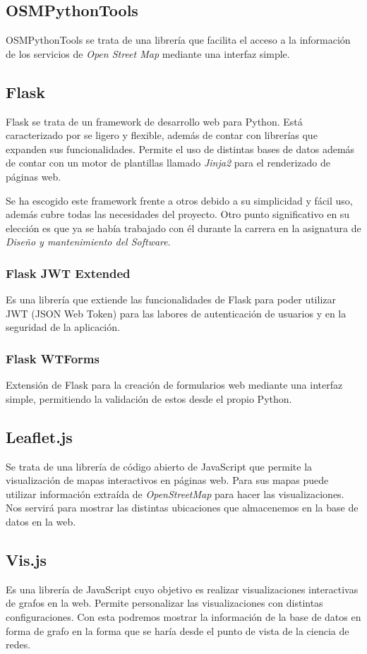 \subsection{OSMPythonTools}
OSMPythonTools se trata de una librería que facilita el acceso a la información de los servicios de \textit{Open Street Map}
mediante una interfaz simple. 

\subsection{Flask}
Flask se trata de un framework de desarrollo web para Python. Está caracterizado por se ligero y flexible,
además de contar con librerías que expanden sus funcionalidades. Permite el uso de distintas bases de datos además de contar
con un motor de plantillas llamado \textit{Jinja2} para el renderizado de páginas web.

Se ha escogido este framework frente a otros debido a su simplicidad y fácil uso, además cubre todas
las necesidades del proyecto. Otro punto significativo en su elección es que ya se había trabajado con él
durante la carrera en la asignatura de \textit{Diseño y mantenimiento del Software}.

\subsubsection{Flask JWT Extended}
Es una librería que extiende las funcionalidades de Flask para poder utilizar JWT (JSON Web Token)
para las labores de autenticación de usuarios y en la seguridad de la aplicación.
\subsubsection{Flask WTForms}
Extensión de Flask para la creación de formularios web mediante una interfaz simple, permitiendo
la validación de estos desde el propio Python.

\subsection{Leaflet.js}
Se trata de una librería de código abierto de JavaScript que permite la visualización de mapas interactivos en páginas web.
Para sus mapas puede utilizar información extraída de \textit{OpenStreetMap} para hacer las visualizaciones.
Nos servirá para mostrar las distintas ubicaciones que almacenemos en la base de datos en la web.

\subsection{Vis.js}
Es una librería de JavaScript cuyo objetivo es realizar visualizaciones interactivas de grafos en la web.
Permite personalizar las visualizaciones con distintas configuraciones. Con esta podremos mostrar
la información de la base de datos en forma de grafo en la forma que se haría desde el punto de vista de la ciencia
de redes.

